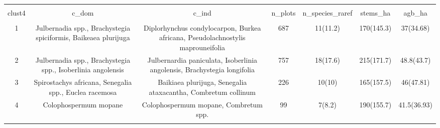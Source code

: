 
\begin{table}[!htbp] \centering 
  \caption{} 
  \label{clust_summ} 
\begin{tabular}{@{\extracolsep{5pt}} ccccccc} 
\\[-1.8ex]\hline 
\hline \\[-1.8ex] 
clust4 & c\_dom & c\_ind & n\_plots & n\_species\_raref & stems\_ha & agb\_ha \\ 
\hline \\[-1.8ex] 
1 & Julbernadia spp., Brachystegia spiciformis, Baikeaea plurijuga & Diplorhynchus condylocarpon, Burkea africana, Pseudolachnostylis maprouneifolia & 687 & 11(11.2) & 170(145.3) & 37(34.68) \\ 
2 & Julbernadia spp., Brachystegia spp., Isoberlinia angolensis & Julbernardia paniculata, Isoberlinia angolensis, Brachystegia longifolia & 757 & 18(17.6) & 215(171.7) & 48.8(43.7) \\ 
3 & Spirostachys africana, Senegalia spp., Euclea racemosa & Baikiaea plurijuga, Senegalia ataxacantha, Combretum collinum & 226 & 10(10) & 165(157.5) & 46(47.81) \\ 
4 & Colophospermum mopane & Colophospermum mopane, Combretum spp. & 99 & 7(8.2) & 190(155.7) & 41.5(36.93) \\ 
\hline \\[-1.8ex] 
\end{tabular} 
\end{table} 
